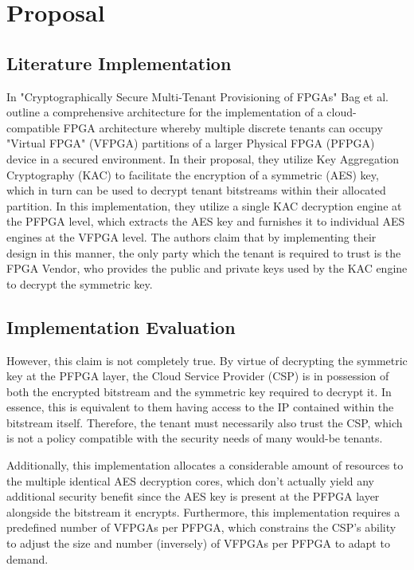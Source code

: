 
\section{Proposal}\label{sec:Proposal}

\subsection{Literature Implementation}\label{sec:LitImpl}
In "Cryptographically Secure Multi-Tenant Provisioning of FPGAs"\cite{bag_cryptographically_2020} Bag et al. outline a comprehensive architecture for the implementation of a cloud-compatible FPGA architecture whereby multiple discrete tenants can occupy "Virtual FPGA" (VFPGA) partitions of a larger Physical FPGA (PFPGA) device in a secured environment. In their proposal, they utilize Key Aggregation Cryptography (KAC) to facilitate the encryption of a symmetric (AES) key, which in turn can be used to decrypt tenant bitstreams within their allocated partition. In this implementation, they utilize a single KAC decryption engine at the PFPGA level, which extracts the AES key and furnishes it to individual AES engines at the VFPGA level. The authors claim that by implementing their design in this manner, the only party which the tenant is required to trust is the FPGA Vendor, who provides the public and private keys used by the KAC engine to decrypt the symmetric key.

\subsection{Implementation Evaluation}\label{subsec:LitEval}
However, this claim is not completely true. By virtue of decrypting the symmetric key at the PFPGA layer, the Cloud Service Provider (CSP) is in possession of both the encrypted bitstream and the symmetric key required to decrypt it. In essence, this is equivalent to them having access to the IP contained within the bitstream itself. Therefore, the tenant must necessarily also trust the CSP, which is not a policy compatible with the security needs of many would-be tenants.

Additionally, this implementation allocates a considerable amount of resources to the multiple identical AES decryption cores, which don't actually yield any additional security benefit since the AES key is present at the PFPGA layer alongside the bitstream it encrypts. Furthermore, this implementation requires a predefined number of VFPGAs per PFPGA, which constrains the CSP's ability to adjust the size and number (inversely) of VFPGAs per PFPGA to adapt to demand.

